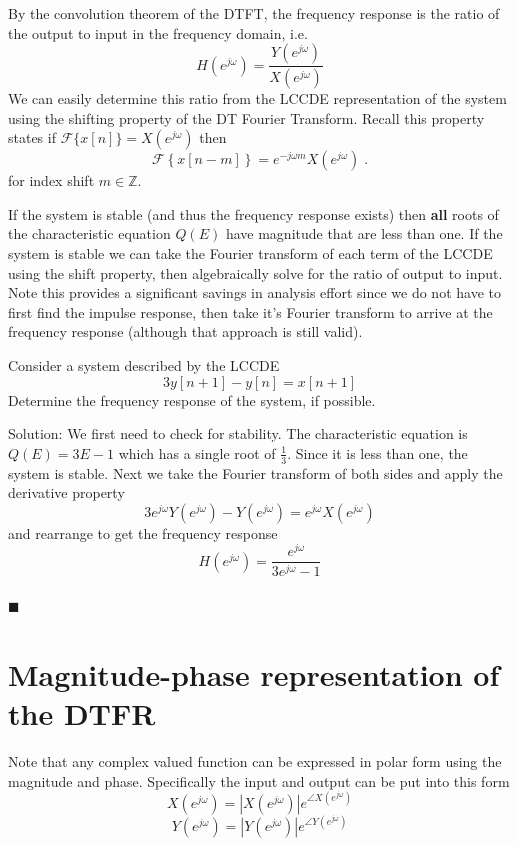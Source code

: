 By the convolution theorem of the DTFT, the frequency response is the ratio of the output to input in the frequency domain, i.e.
\[
H\left(e^{j\omega}\right) = \frac{Y\left(e^{j\omega}\right)}{X\left(e^{j\omega}\right)}
\]
We can easily determine this ratio from the LCCDE representation of the system using the shifting property of the DT Fourier Transform. Recall this property states if $\mathcal{F}\{x[n]\} = X\left(e^{j\omega}\right)$ then
\[
\mathcal{F}\left\{x[n-m] \right\} =  e^{-j\omega m} X\left(e^{j\omega}\right)\; .
\]
for index shift $m\in\mathbb{Z}$.

If the system is stable (and thus the frequency response exists) then \textbf{all} roots of the characteristic equation $Q(E)$ have magnitude that are less than one. If the system is stable we can take the Fourier transform of each term of the LCCDE using the shift property, then algebraically solve for the ratio of output to input. Note this provides a significant savings in analysis effort since we do not have to first find the impulse response, then take it's Fourier transform to arrive at the frequency response (although that approach is still valid).

\begin{example} Consider a system described by the LCCDE
  \[
  3y[n+1]-y[n] = x[n+1]
  \]
  Determine the frequency response of the system, if possible.

  Solution: We first need to check for stability. The characteristic equation is $Q(E) = 3E - 1$ which has a single root of $\frac{1}{3}$. Since it is less than one, the system is stable. Next we take the Fourier transform of both sides and apply the derivative property
  \[
  3e^{j\omega} Y\left(e^{j\omega}\right) - Y\left(e^{j\omega}\right) = e^{j\omega} X\left(e^{j\omega}\right)
  \]
  and rearrange to get the frequency response
  \[
  H\left(e^{j\omega}\right) = \frac{e^{j\omega}}{3e^{j\omega}-1}
  \]\\
  $\blacksquare$
\end{example}

\section{Magnitude-phase representation of the DTFR}

Note that any complex valued function can be expressed in polar form using the magnitude and phase. Specifically the input and output can be put into this form
\[
X\left(e^{j\omega}\right) = |X\left(e^{j\omega}\right)|e^{\angle X\left(e^{j\omega}\right)}
\]
\[
Y\left(e^{j\omega}\right) = |Y\left(e^{j\omega}\right)|e^{\angle Y\left(e^{j\omega}\right)}
\]

